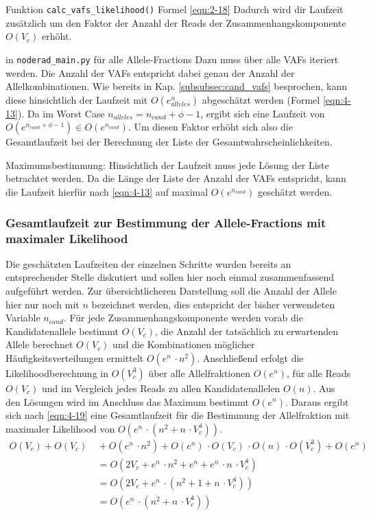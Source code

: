 Funktion \lstinline|calc_vafs_likelihood()| Formel \eqref{eqn:2-18}
Dadurch wird dir Laufzeit zusätzlich um den Faktor der Anzahl der Reads der Zusammenhangskomponente $ O(V_{c}) $ erhöht.

in \lstinline|noderad_main.py| für alle Allele-Fractions
Dazu muss über alle VAFs iteriert werden. Die Anzahl der VAFs entspricht dabei genau der Anzahl der Allelkombinationen. Wie bereits in Kap. \ref{subsubsec:cand_vafs} besprochen, kann diese hinsichtlich der Laufzeit mit $ O(e^n_{alleles}) $ abgeschätzt werden (Formel \eqref{eqn:4-13}). Da im Worst Case $n_{alleles} = n_{cand} + \phi - 1$, ergibt sich eine Laufzeit von $ O(e^{n_{cand} + \phi - 1}) \in O(e^{n_{cand}}) $. Um diesen Faktor erhöht sich also die Gesamtlaufzeit bei der Berechnung der Liste der Gesamtwahrscheinlichkeiten.

Maximumsbestimmung: 
Hinsichtlich der Laufzeit muss jede Lösung der Liste betrachtet werden. Da die Länge der Liste der Anzahl der VAFs entspricht, kann die Laufzeit hierfür nach \eqref{eqn:4-13} auf maximal $ O(e^{n_{cand}}) $ geschätzt werden.


\subsubsection{Gesamtlaufzeit zur Bestimmung der Allele-Fractions mit maximaler Likelihood} \label{subsec:al_compl}
Die geschätzten Laufzeiten der einzelnen Schritte wurden bereits an entsprechender Stelle diskutiert und sollen hier noch einmal zusammenfassend aufgeführt werden. Zur übersichtlicheren Darstellung soll die Anzahl der Allele hier nur noch mit $n$ bezeichnet werden, dies entspricht der bisher verwendeten Variable $n_{cand}$. Für jede Zusammenhangskomponente werden vorab die Kandidatenallele bestimmt $ O(V_{c}) $, die Anzahl der tatsächlich zu erwartenden Allele berechnet $ O(V_{c}) $ und die Kombinationen möglicher Häufigkeitsverteilungen ermittelt $ O(e^{n} \, \cdotp n^2) $. Anschließend erfolgt die Likelihoodberechnung in $ O(V_{c}^3) $ über alle Allelfraktionen $ O(e^{n}) $, für alle Reads $ O(V_{c}) $ und im Vergleich jedes Reads zu allen Kandidatenallelen $ O(n) $. Aus den Lösungen wird im Anschluss das Maximum bestimmt $ O(e^{n}) $. Daraus ergibt sich nach \ref{eqn:4-19} eine Gesamtlaufzeit für die Bestimmung der Allelfraktion mit maximaler Likelihood von $ O(e^n \, \cdotp (n^2 + n \, \cdotp V_{c}^4)) $. 
\begin{equation} \label{eqn:4-19}
\tag{4-19}
\begin{aligned}
O(V_{c}) +  O(V_{c}) &\ {} + O(e^n \, \cdotp n^2) + O(e^n) \, \cdotp O(V_{c}) \, \cdotp O(n) \, \cdotp O(V_{c}^3) + O(e^n)\\
&\ =  O(2 V_{c} + e^n \, \cdotp n^2 + e^n + e^n \, \cdotp n \, \cdotp V_{c}^4)\\
&\ = O(2 V_{c} + e^n \, \cdotp (n^2 + 1 + n \, \cdotp V_{c}^4))\\
&\ = O(e^n \, \cdotp (n^2 + n \, \cdotp V_{c}^4)) \\
\end{aligned}
\end{equation}

